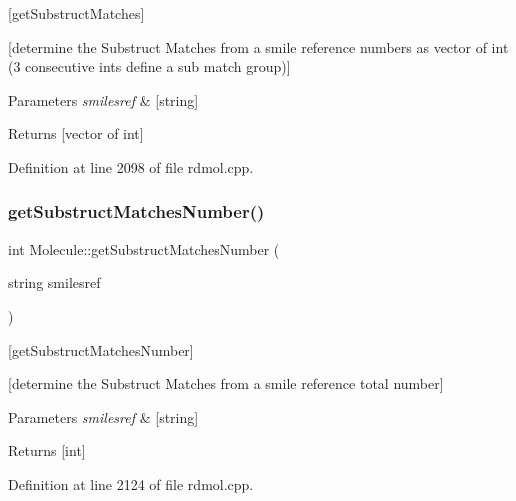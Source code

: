 \mbox{[}get\+Substruct\+Matches\mbox{]} 

\mbox{[}determine the Substruct Matches from a smile reference numbers as vector of int (3 consecutive ints define a sub match group)\mbox{]}


\begin{DoxyParams}{Parameters}
{\em smilesref} & \mbox{[}string\mbox{]} \\
\hline
\end{DoxyParams}
\begin{DoxyReturn}{Returns}
\mbox{[}vector of int\mbox{]} 
\end{DoxyReturn}


Definition at line 2098 of file rdmol.\+cpp.

\mbox{\label{class_molecule_a07e55f82e97dfe4c49855b5bb81c49d2}} 
\subsubsection{\texorpdfstring{get\+Substruct\+Matches\+Number()}{getSubstructMatchesNumber()}}
{\footnotesize\ttfamily int Molecule\+::get\+Substruct\+Matches\+Number (\begin{DoxyParamCaption}\item[{string}]{smilesref }\end{DoxyParamCaption})}



\mbox{[}get\+Substruct\+Matches\+Number\mbox{]} 

\mbox{[}determine the Substruct Matches from a smile reference total number\mbox{]}


\begin{DoxyParams}{Parameters}
{\em smilesref} & \mbox{[}string\mbox{]} \\
\hline
\end{DoxyParams}
\begin{DoxyReturn}{Returns}
\mbox{[}int\mbox{]} 
\end{DoxyReturn}


Definition at line 2124 of file rdmol.\+cpp.

\mbox{\label{class_molecule_afe8104a0a538fe6b64c089d409871f0d}} 

